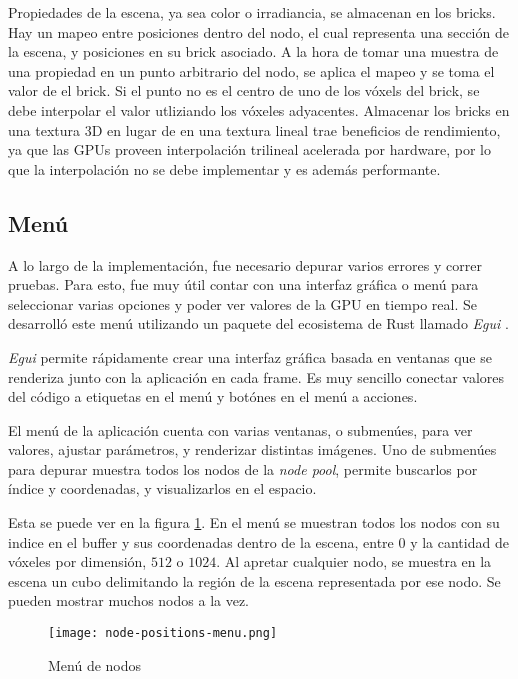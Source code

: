 Propiedades de la escena, ya sea color o irradiancia, se almacenan en los bricks.
Hay un mapeo entre posiciones dentro del nodo, el cual representa una sección de la escena, y posiciones en su brick asociado.
A la hora de tomar una muestra de una propiedad en un punto arbitrario del nodo, se aplica el mapeo y se toma el valor de el brick.
Si el punto no es el centro de uno de los vóxels del brick, se debe interpolar el valor utliziando los vóxeles adyacentes.
Almacenar los bricks en una textura 3D en lugar de en una textura lineal trae beneficios de rendimiento, ya que las GPUs proveen interpolación trilineal acelerada por hardware, por lo que la interpolación no se debe implementar y es además performante.

\subsection{Menú}

A lo largo de la implementación, fue necesario depurar varios errores y correr pruebas.
Para esto, fue muy útil contar con una interfaz gráfica o menú para seleccionar varias opciones y poder ver valores de la GPU en tiempo real.
Se desarrolló este menú utilizando un paquete del ecosistema de Rust llamado \textit{Egui} \cite{egui}.

\textit{Egui} permite rápidamente crear una interfaz gráfica basada en ventanas que se renderiza junto con la aplicación en cada frame.
Es muy sencillo conectar valores del código a etiquetas en el menú y botónes en el menú a acciones.

El menú de la aplicación cuenta con varias ventanas, o submenúes, para ver valores, ajustar parámetros, y renderizar distintas imágenes.
Uno de submenúes para depurar muestra todos los nodos de la \textit{node pool}, permite buscarlos por índice y coordenadas, y visualizarlos en el espacio.

Esta se puede ver en la figura \ref{fig:node-positions-menu}.
En el menú se muestran todos los nodos con su indice en el buffer y sus coordenadas dentro de la escena, entre $0$ y la cantidad de vóxeles por dimensión, $512$ o $1024$.
Al apretar cualquier nodo, se muestra en la escena un cubo delimitando la región de la escena representada por ese nodo.
Se pueden mostrar muchos nodos a la vez.

\begin{figure}
    \centering
    \texttt{[image: node-positions-menu.png]}
    \caption{Menú de nodos}
    \label{fig:node-positions-menu}
\end{figure}

